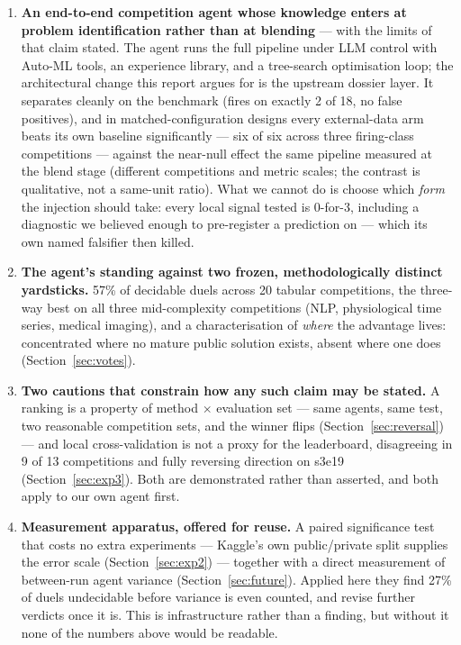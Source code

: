 \documentclass[11pt,a4paper]{article}
\begin{document}
\begin{enumerate}[leftmargin=*]
  \item \textbf{An end-to-end competition agent whose knowledge enters at problem
  identification rather than at blending} --- with the limits of that claim stated. The agent
  runs the full pipeline under LLM control with Auto-ML tools, an experience library, and a
  tree-search optimisation loop; the architectural change this report argues for is the
  upstream dossier layer. It separates cleanly on the benchmark (fires on exactly 2 of 18, no
  false positives), and in matched-configuration designs every external-data arm beats its own
  baseline significantly --- six of six across three firing-class competitions --- against the
  near-null effect the same pipeline measured at the blend stage (different competitions and
  metric scales; the contrast is qualitative, not a same-unit ratio). What we
  cannot do is choose which \emph{form} the injection should take: every local signal tested is
  0-for-3, including a diagnostic we believed enough to pre-register a prediction on --- which
  its own named falsifier then killed.

  \item \textbf{The agent's standing against two frozen, methodologically distinct yardsticks.}
  57\% of decidable duels across 20 tabular competitions, the three-way best on all three
  mid-complexity competitions (NLP, physiological time series, medical imaging), and a
  characterisation of \emph{where} the advantage lives: concentrated where no mature public
  solution exists, absent where one does (Section~\ref{sec:votes}).

  \item \textbf{Two cautions that constrain how any such claim may be stated.} A ranking is a
  property of method $\times$ evaluation set --- same agents, same test, two reasonable
  competition sets, and the winner flips (Section~\ref{sec:reversal}) --- and local
  cross-validation is not a proxy for the leaderboard, disagreeing in 9 of 13 competitions and
  fully reversing direction on s3e19 (Section~\ref{sec:exp3}). Both are demonstrated rather
  than asserted, and both apply to our own agent first.

  \item \textbf{Measurement apparatus, offered for reuse.} A paired significance test that
  costs no extra experiments --- Kaggle's own public/private split supplies the error scale
  (Section~\ref{sec:exp2}) --- together with a direct measurement of between-run agent variance
  (Section~\ref{sec:future}). Applied here they find 27\% of duels undecidable before variance
  is even counted, and revise further verdicts once it is. This is infrastructure rather than a
  finding, but without it none of the numbers above would be readable.
\end{enumerate}
\end{document}

